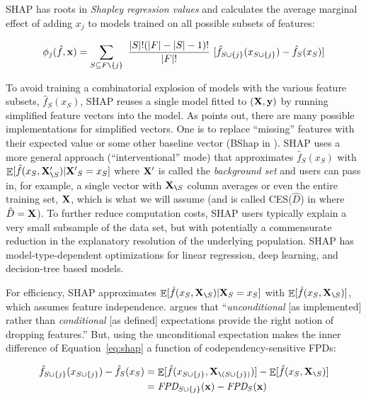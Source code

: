 \documentclass{article}
\renewcommand{\eqref}[1]{Equation~\ref{#1}}
\renewcommand{\slash}{\texttt{\char`\\}}
\DeclareMathOperator{\Ex}{\mathbb{E}}
\begin{document}

SHAP \cite{shap} has roots in {\em Shapley regression values} \citep{shapley-regression} and calculates the average marginal effect of adding $x_j$ to models trained on all possible  subsets of features:

\begin{equation}\label{eq:shap}
\phi_j(\hat{f},{\bf x}) = \sum_{S \subseteq F \slash \{j\}}\
\frac{|S|!(|F|-|S|-1)!}{|F|!}\
 [ \hat{f}_{S \cup \{j\}}(x_{S \cup \{j\}}) - \hat{f}_S(x_S) ]
\end{equation}

To avoid training a combinatorial explosion of models with the various feature subsets, $\hat{f}_S(x_S)$, SHAP reuses a single model fitted to $(\bf X, y)$ by running simplified feature vectors into the model. As \cite{manyshap} points out, there are many possible implementations for simplified vectors. One is to replace ``missing''  features with their expected value or some other baseline vector (BShap in \cite{manyshap}). SHAP uses a more general approach (``interventional'' mode) that approximates $\hat{f}_S(x_S)$ with $\Ex[\hat{f}(x_{S},{\bf X}'_{\slash S}) | {\bf X'}_S = x_S]$ where ${\bf X}'$ is called the {\em background set} and users can pass in, for example, a single vector with ${\bf X}_{\slash S}$ column averages or even the entire training set, $\bf X$, which is what we will assume (and is called CES($\hat{D}$) in \cite{manyshap} where $\hat{D}={\bf X}$). To further reduce computation costs, SHAP users typically explain a very small subsample of the data set, but with potentially a commensurate reduction in the explanatory resolution of the underlying population. SHAP has model-type-dependent optimizations for linear regression, deep learning, and decision-tree based models.

For efficiency, SHAP approximates $\Ex[\hat{f}(x_{S},{\bf X}_{\slash S}) | {\bf X}_S = x_S]$ with $\Ex[\hat{f}(x_{S},{\bf X}_{\slash S})]$, which assumes feature independence. \cite{janzing2019feature} argues that ``{\em unconditional} [as implemented] rather than {\em conditional} [as defined] expectations provide the right notion of dropping features.''  But, using the unconditional expectation makes the inner difference of \eqref{eq:shap} a function of codependency-sensitive FPDs:

\[
\begin{split}
\hat{f}_{S \cup \{j\}}(x_{S \cup \{j\}}) - \hat{f}_S(x_S) & = \Ex[\hat{f}(x_{S \cup \{j\}},{\bf X}_{\slash (S \cup \{j\})})] - \Ex[\hat{f}(x_{S},{\bf X}_{\slash S})]\\
 & = \text{\it FPD}_{S \cup \{j\}}({\bf x}) - \text{\it FPD}_{S}({\bf x})
\end{split}
\]
\end{document}
